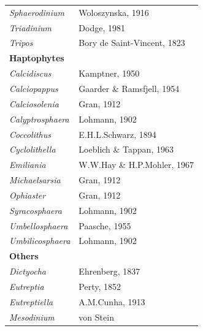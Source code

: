 \documentclass[]{agujournal2019}
\begin{document}
\begin{table}
{\begin{tabular}{@{}ll@{}}
\textit{Sphaerodinium}     & Woloszynska, 1916                                          \\
\textit{Triadinium}        & Dodge, 1981                                                \\
\textit{Tripos}            & Bory de Saint-Vincent, 1823                                \\
\textbf{Haptophytes}        &                                                            \\
\textit{Calcidiscus}       & Kamptner, 1950                                             \\
\textit{Calciopappus}      & Gaarder \& Ramsfjell, 1954                                 \\
\textit{Calciosolenia}     & Gran, 1912                                                 \\
\textit{Calyptrosphaera}   & Lohmann, 1902                                              \\
\textit{Coccolithus}       & E.H.L.Schwarz, 1894                                        \\
\textit{Cyclolithella}     & Loeblich \& Tappan, 1963                                   \\
\textit{Emiliania}         & W.W.Hay \& H.P.Mohler, 1967                                \\
\textit{Michaelsarsia}     & Gran, 1912                                                 \\
\textit{Ophiaster}         & Gran, 1912                                                 \\
\textit{Syracosphaera}     & Lohmann, 1902                                              \\
\textit{Umbellosphaera}    & Paasche, 1955                                              \\
\textit{Umbilicosphaera}   & Lohmann, 1902                                              \\
\textbf{Others}            &                                                            \\
\textit{Dictyocha}         & Ehrenberg, 1837                                            \\
\textit{Eutreptia}         & Perty, 1852                                                \\
\textit{Eutreptiella}      & A.M.Cunha, 1913                                            \\
\textit{Mesodinium}        & von Stein                                                 
\end{tabular}}

\label{tab:sup:GenusFuncGroups}
\end{table}
\end{document}
